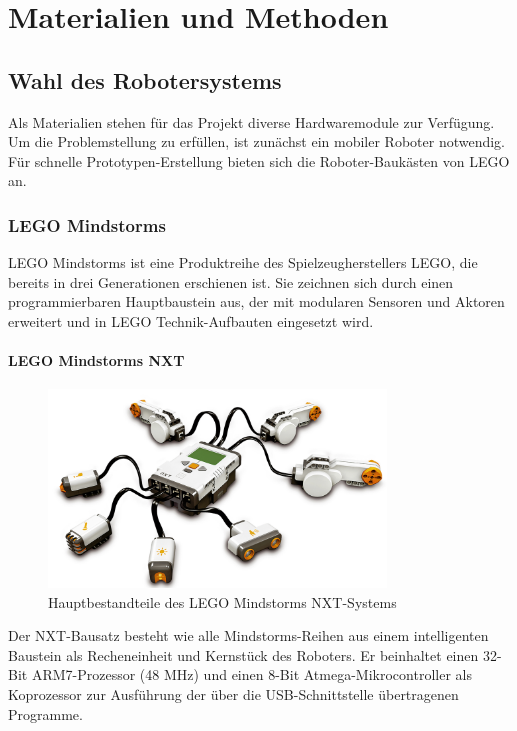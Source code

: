 \chapter{Materialien und Methoden}
\label{cha:Materials}

\section{Wahl des Robotersystems}

Als Materialien stehen für das Projekt diverse Hardwaremodule zur Verfügung. Um die Problemstellung zu erfüllen, ist zunächst ein mobiler Roboter notwendig. Für schnelle Prototypen-Erstellung bieten sich die Roboter-Baukästen von LEGO an.

\subsection{LEGO Mindstorms}

LEGO Mindstorms ist eine Produktreihe des Spielzeugherstellers LEGO, die bereits in drei Generationen erschienen ist. Sie zeichnen sich durch einen programmierbaren Hauptbaustein aus, der mit modularen Sensoren und Aktoren erweitert und in LEGO Technik-Aufbauten eingesetzt wird.

\subsubsection{LEGO Mindstorms NXT}

\begin{figure}[h]
\centering
\includegraphics[width=0.8\textwidth]{Bilder/MatsAndMets/nxt}
\caption{Hauptbestandteile des LEGO Mindstorms NXT-Systems}
\label{fig:nxt}
\end{figure}

Der NXT-Bausatz besteht wie alle Mindstorms-Reihen aus einem intelligenten Baustein als Recheneinheit und Kernstück des Roboters. Er beinhaltet einen 32-Bit ARM7-Prozessor (48 MHz) und einen 8-Bit Atmega-Mikrocontroller als Koprozessor zur Ausführung der über die USB-Schnittstelle übertragenen Programme.

